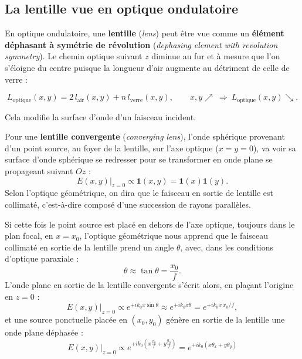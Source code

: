 \subsection{La lentille vue en optique ondulatoire}

En optique ondulatoire, une \textbf{lentille} (\textit{lens}) peut être vue
comme un \textbf{élément déphasant à symétrie de révolution} (\textit{dephasing
element with revolution symmetry}). Le chemin optique suivant $z$ diminue au fur
et à mesure que l'on s'éloigne du centre puisque la longueur d'air augmente au
détriment de celle de verre :

\[
  L_{\text{optique}}(x,y)=2\,l_{\text{air}}(x,y)+n\,l_{\text{verre}}(x,y),
  \qquad x,y \nearrow \ \Longrightarrow\ L_{\text{optique}}(x,y)\searrow .
\]

Cela modifie la surface d'onde d'un faisceau incident.

\begin{prop}
  Pour une \textbf{lentille convergente} (\textit{converging lens}), l'onde
  sphérique provenant d'un point source, au foyer de la lentille, sur l'axe
  optique ($x=y=0$), va voir sa surface d'onde sphérique se redresser pour se
  transformer en onde plane se propageant suivant $Oz$ :
  \[
    E(x,y)\big|_{z=0}\propto \mathbf{1}(x,y)=\mathbf{1}(x)\mathbf{1}(y).
  \]
  Selon l'optique géométrique, on dira que le faisceau en sortie de lentille est
  collimaté, c'est-à-dire composé d'une succession de rayons parallèles.
\end{prop}

\begin{prop}
  Si cette fois le point source est placé en dehors de l'axe optique, toujours
  dans le plan focal, en $x=x_0$, l'optique géométrique nous apprend que le
  faisceau collimaté en sortie de la lentille prend un angle $\theta$, avec,
  dans les conditions d'optique paraxiale :
  \[
    \theta\approx\tan\theta=\frac{x_0}{f}.
  \]
  L'onde plane en sortie de la lentille convergente s'écrit alors, en plaçant
  l'origine en $z=0$ :
  \[
    E(x,y)\big|_{z=0}\propto e^{+ik_0x\sin\theta}\approx e^{+ik_0x\theta}
    =e^{+ik_0x\,x_0/f},
  \]
  et une source ponctuelle placée en $(x_0,y_0)$ génère en sortie de la
  lentille une onde plane déphasée :
  \[
    \boxed{\,E(x,y)\big|_{z=0}\propto
      e^{+ik_0\left(x\frac{x_0}{f}+y\frac{y_0}{f}\right)}
      =e^{+ik_0(x\theta_x+y\theta_y)} \,}
  \]
\end{prop}

